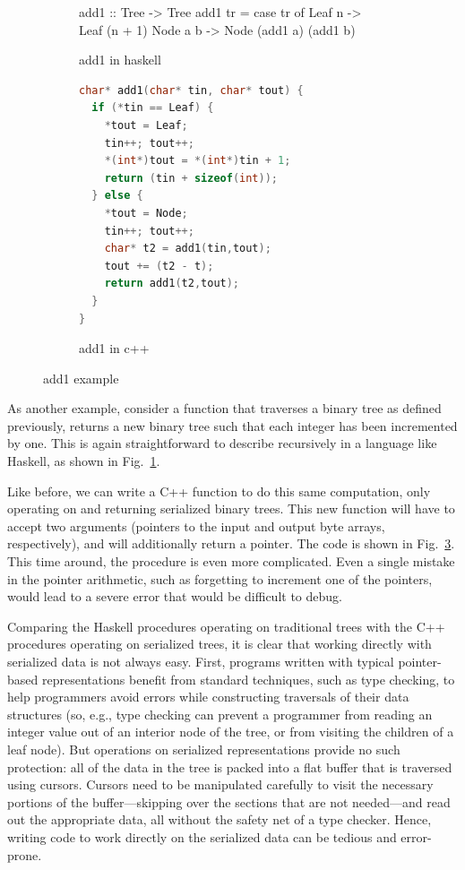 \documentclass[showabstract,showacknowledgments,showpreface,showdedication,school]{iuphd}
\theoremstyle{nonumberplain}
\newcommand{\Figref}[1]{Fig.~\ref{#1}}
\begin{document}
\begin{figure}
  \begin{subfigure}{\textwidth}
\begin{code}
add1 :: Tree -> Tree
add1 tr =
  case tr of
    Leaf n -> Leaf (n + 1)
    Node a b -> Node (add1 a) (add1 b)
\end{code}
    \caption{add1 in haskell}\label{fig:add1-haskell}
  \end{subfigure}

  \begin{subfigure}{\textwidth}
\begin{lstlisting}[language=C++]
char* add1(char* tin, char* tout) {
  if (*tin == Leaf) {
    *tout = Leaf;
    tin++; tout++;
    *(int*)tout = *(int*)tin + 1;
    return (tin + sizeof(int));
  } else {
    *tout = Node;
    tin++; tout++;
    char* t2 = add1(tin,tout);
    tout += (t2 - t);
    return add1(t2,tout);
  }
}
\end{lstlisting}
    \caption{add1 in c++}\label{fig:add1-cpp}
  \end{subfigure}
\caption{add1 example}
\end{figure}

As another example, consider a function that traverses a binary tree as defined
previously, returns a new binary tree such that each integer has been incremented
by one. This is again straightforward to describe recursively in a language
like Haskell, as shown in \Figref{fig:add1-haskell}.

Like before, we can write a C++ function to do this same computation, only
operating on and returning serialized binary trees. This new function will
have to accept two arguments (pointers to the input and output byte arrays,
respectively), and will additionally return a pointer. The code is shown in
\Figref{fig:add1-cpp}. This time around, the procedure is even more
complicated. Even a single mistake in the pointer arithmetic, such as forgetting
to increment one of the pointers, would lead to a severe error that would
be difficult to debug.



Comparing the Haskell procedures operating on traditional trees with the C++
procedures operating on serialized trees, it is clear that working directly with
serialized data is not always easy. First, programs written with typical
pointer-based representations benefit from standard techniques, such as type
checking, to help programmers avoid errors while constructing traversals of
their data structures (so, e.g., type checking can prevent a programmer from
reading an integer value out of an interior node of the tree, or from visiting
the children of a leaf node). But operations on serialized representations
provide no such protection: all of the data in the tree is packed into a flat
buffer that is traversed using cursors. Cursors need to be manipulated carefully
to visit the necessary portions of the buffer---skipping over the sections that
are not needed---and read out the appropriate data, all without the safety net
of a type checker. Hence, writing code to work directly on the serialized data
can be tedious and error-prone.
\end{document}
